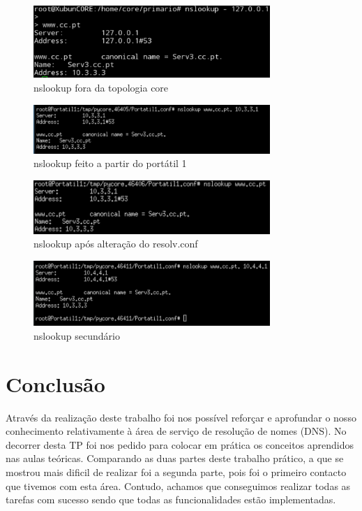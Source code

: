 \documentclass[a4paper]{report}
\begin{document}
\begin{figure}[H]
    \centering 
    \includegraphics[width=0.8\textwidth]{images/ns_outcore.png}  
    \caption{nslookup fora da topologia core}
    \label{fig:ns_outcore}
\end{figure}

\begin{figure}[H]
    \centering 
    \includegraphics[width=0.8\textwidth]{images/nslookup_portatil1.png}  
    \caption{nslookup feito a partir do portátil 1}
    \label{fig:nslookup_portatil1}
\end{figure}

\begin{figure}[H]
    \centering 
    \includegraphics[width=0.8\textwidth]{images/nslookup_resolv.png}  
    \caption{nslookup após alteração do resolv.conf}
    \label{fig:nslookup_resolv}
\end{figure}

\begin{figure}[H]
    \centering 
    \includegraphics[width=0.8\textwidth]{images/nslookup_secondario.png}  
    \caption{nslookup secundário}
    \label{fig:nslookup_resolv}
\end{figure}

\chapter{Conclusão}

Através da realização deste trabalho foi nos possível reforçar e aprofundar
o nosso conhecimento relativamente à área de serviço de resolução de nomes 
(DNS). No decorrer desta TP foi nos pedido para colocar em prática os 
conceitos aprendidos nas aulas teóricas.
Comparando as duas partes deste trabalho prático, a que se mostrou mais 
dificil de realizar foi a segunda parte, pois foi o primeiro contacto que
tivemos com esta área. Contudo, achamos que conseguimos realizar todas as
tarefas com sucesso sendo que todas as funcionalidades estão implementadas.
\end{document}
